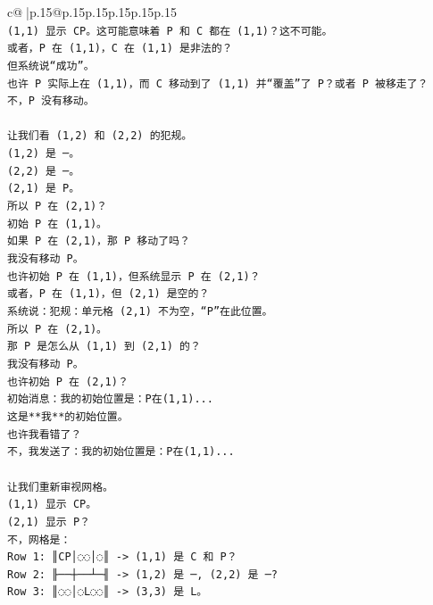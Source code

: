 \documentclass{article}
\begin{document}
{\begin{supertabular}{c@{$\;$}|p{.15\linewidth}@{}p{.15\linewidth}p{.15\linewidth}p{.15\linewidth}p{.15\linewidth}p{.15\linewidth}}
{{{\\ 
\texttt{(1,1) 显示 CP。这可能意味着 P 和 C 都在 (1,1)？这不可能。} \\
\texttt{或者，P 在 (1,1)，C 在 (1,1) 是非法的？} \\
\texttt{但系统说“成功”。} \\
\texttt{也许 P 实际上在 (1,1)，而 C 移动到了 (1,1) 并“覆盖”了 P？或者 P 被移走了？} \\
\texttt{不，P 没有移动。} \\
\\ 
\texttt{让我们看 (1,2) 和 (2,2) 的犯规。} \\
\texttt{(1,2) 是 ─。} \\
\texttt{(2,2) 是 ─。} \\
\texttt{(2,1) 是 P。} \\
\texttt{所以 P 在 (2,1)？} \\
\texttt{初始 P 在 (1,1)。} \\
\texttt{如果 P 在 (2,1)，那 P 移动了吗？} \\
\texttt{我没有移动 P。} \\
\texttt{也许初始 P 在 (1,1)，但系统显示 P 在 (2,1)？} \\
\texttt{或者，P 在 (1,1)，但 (2,1) 是空的？} \\
\texttt{系统说：犯规：单元格 (2,1) 不为空，“P”在此位置。} \\
\texttt{所以 P 在 (2,1)。} \\
\texttt{那 P 是怎么从 (1,1) 到 (2,1) 的？} \\
\texttt{我没有移动 P。} \\
\texttt{也许初始 P 在 (2,1)？} \\
\texttt{初始消息：我的初始位置是：P在(1,1)...} \\
\texttt{这是**我**的初始位置。} \\
\texttt{也许我看错了？} \\
\texttt{不，我发送了：我的初始位置是：P在(1,1)...} \\
\\ 
\texttt{让我们重新审视网格。} \\
\texttt{(1,1) 显示 CP。} \\
\texttt{(2,1) 显示 P？} \\
\texttt{不，网格是：} \\
\texttt{Row 1: ║CP│◌◌│◌║ {-}> (1,1) 是 C 和 P？} \\
\texttt{Row 2: ╟──┼──┴─╢ {-}> (1,2) 是 ─, (2,2) 是 ─?} \\
\texttt{Row 3: ║◌◌│◌L◌◌║ {-}> (3,3) 是 L。} \\
}}}
\end{supertabular}}
\end{document}
